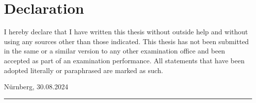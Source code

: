 \chapter*{Declaration}
\thispagestyle{empty}
I hereby declare that I have written this thesis without outside help and without using any sources other than those indicated. This thesis has not been submitted in the same or a similar version to any other examination office and been accepted as part of an examination performance. All statements that have been adopted literally or paraphrased are marked as such.\\
\vspace{1.5cm}

Nürnberg, 30.08.2024\\[-5mm]
\hspace*{10.4cm}\rule[-0.3pt]{0.35\linewidth}{0.4pt}\\[0mm]
\hspace*{11.5cm}\NAME

\thispagestyle{empty}
\mbox{ }
\newpage